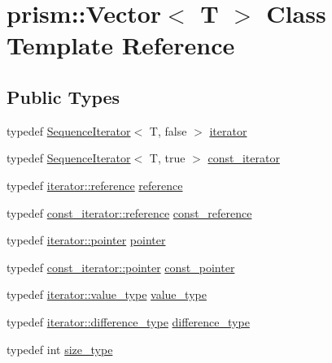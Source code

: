 \hypertarget{classprism_1_1_vector}{}\section{prism\+:\+:Vector$<$ T $>$ Class Template Reference}
\label{classprism_1_1_vector}
\subsection*{Public Types}
\begin{DoxyCompactItemize}
\item 
typedef \hyperlink{structprism_1_1_sequence_iterator}{Sequence\+Iterator}$<$ T, false $>$ \hyperlink{classprism_1_1_vector_aec3211503bad8800731cc3e08170592e}{iterator}
\item 
typedef \hyperlink{structprism_1_1_sequence_iterator}{Sequence\+Iterator}$<$ T, true $>$ \hyperlink{classprism_1_1_vector_a4ae2d663b42920c426b768119bf9c770}{const\+\_\+iterator}
\item 
typedef \hyperlink{structprism_1_1_sequence_iterator_ac93bc1c2e901ea09aba9c3af33da21ba}{iterator\+::reference} \hyperlink{classprism_1_1_vector_a8ccf98342707efbed82918a44be97438}{reference}
\item 
typedef \hyperlink{structprism_1_1_sequence_iterator_ac93bc1c2e901ea09aba9c3af33da21ba}{const\+\_\+iterator\+::reference} \hyperlink{classprism_1_1_vector_a75325487acaa0f63496c110e5a5632bb}{const\+\_\+reference}
\item 
typedef \hyperlink{structprism_1_1_sequence_iterator_aba1344ee0e1c4be6658f8a3413c66df2}{iterator\+::pointer} \hyperlink{classprism_1_1_vector_a9823d64f361cdff3fcc5043e8b4bd882}{pointer}
\item 
typedef \hyperlink{structprism_1_1_sequence_iterator_aba1344ee0e1c4be6658f8a3413c66df2}{const\+\_\+iterator\+::pointer} \hyperlink{classprism_1_1_vector_a0bf16322f83f0ad9103815a1cac16156}{const\+\_\+pointer}
\item 
typedef \hyperlink{structprism_1_1_sequence_iterator_a3b926a44e4184aecd9ab649cadab392d}{iterator\+::value\+\_\+type} \hyperlink{classprism_1_1_vector_a12f8585af6daa44e7732880b3f725ee3}{value\+\_\+type}
\item 
typedef \hyperlink{structprism_1_1_sequence_iterator_a256c83c7b6da801b16778f39697e8db3}{iterator\+::difference\+\_\+type} \hyperlink{classprism_1_1_vector_a5fe3b74bfb30d75aa74d4d896e6b7227}{difference\+\_\+type}
\item 
typedef int \hyperlink{classprism_1_1_vector_a14c909f500f13b8b7a276bb97ae746e8}{size\+\_\+type}
\end{DoxyCompactItemize}
